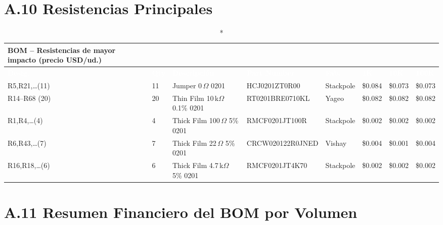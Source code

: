\section*{A.10 Resistencias Principales}

\begin{longtable}{C{1.5cm} C{0.5cm} L{2.8cm} L{3.0cm} L{1.8cm} R{1.1cm} R{1.1cm} R{1.1cm}}
  \caption*{BOM -- Resistencias de mayor impacto (precio USD/ud.)}\\
  \toprule
  \textcolor{white}{\textbf{Desig.}} &
  \textcolor{white}{\textbf{Qty}} &
  \textcolor{white}{\textbf{Descripción}} &
  \textcolor{white}{\textbf{Part Number}} &
  \textcolor{white}{\textbf{Fab.}} &
  \textcolor{white}{\textbf{1K}} &
  \textcolor{white}{\textbf{10K}} &
  \textcolor{white}{\textbf{100K}} \\
  \midrule
  \endfirsthead
  \midrule \endhead \bottomrule \endfoot
  R5,R21,\ldots (11)  & 11 & Jumper 0\,$\Omega$ 0201              & HCJ0201ZT0R00    & Stackpole & \$0.084 & \$0.073 & \$0.073 \\
  R14--R68 (20)       & 20 & Thin Film 10\,k$\Omega$ 0.1\% 0201  & RT0201BRE0710KL  & Yageo     & \$0.082 & \$0.082 & \$0.082 \\
  R1,R4,\ldots (4)    & 4  & Thick Film 100\,$\Omega$ 5\% 0201    & RMCF0201JT100R   & Stackpole & \$0.002 & \$0.002 & \$0.002 \\
  R6,R43,\ldots (7)   & 7  & Thick Film 22\,$\Omega$ 5\% 0201     & CRCW020122R0JNED & Vishay    & \$0.004 & \$0.001 & \$0.004 \\
  R16,R18,\ldots (6)  & 6  & Thick Film 4.7\,k$\Omega$ 5\% 0201  & RMCF0201JT4K70   & Stackpole & \$0.002 & \$0.002 & \$0.002 \\
\end{longtable}

\section*{A.11 Resumen Financiero del BOM por Volumen}

